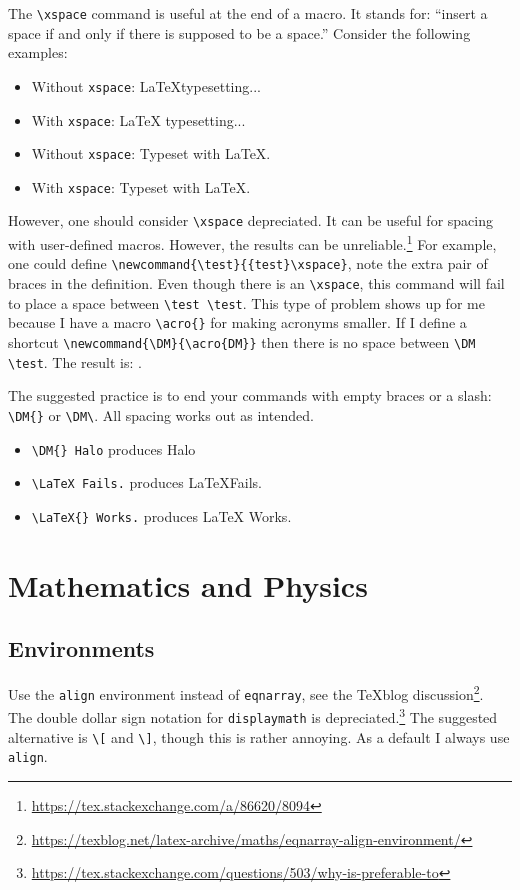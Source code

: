 The \verb!\xspace! command is useful at the end of a macro. It stands for: ``insert a space if and only if there is supposed to be a space.'' Consider the following examples:
\begin{itemize}
	\item Without \texttt{xspace}: \LaTeX typesetting...
	\item With \texttt{xspace}: \LaTeX\xspace typesetting...
	\item Without \texttt{xspace}: Typeset with \LaTeX.
	\item With \texttt{xspace}: Typeset with \LaTeX\xspace.
\end{itemize}
However, one should consider \verb!\xspace! depreciated. It can be useful for spacing with user-defined macros. However, the results can be unreliable.\footnote{\url{https://tex.stackexchange.com/a/86620/8094}}  For example, one could define \verb!\newcommand{\test}{{test}\xspace}!, note the extra pair of braces in the definition. Even though there is an \verb!\xspace!, this command will fail to place a space between \verb!\test \test!. This type of problem shows up for me because I have a macro \verb!\acro{}! for making acronyms smaller. If I define a shortcut \verb!\newcommand{\DM}{\acro{DM}}! then there is no space between \verb!\DM \test!. The result is: \acro{DM}\xspace {test}. 

The suggested practice is to end your commands with empty braces or a slash: \verb!\DM{}! or \verb!\DM\!. All spacing works out as intended. 
\begin{itemize}
	\item \verb!\DM{} Halo! produces \DM{} Halo
	\item \verb!\LaTeX Fails.! produces \LaTeX Fails.
	\item \verb!\LaTeX{} Works.! produces \LaTeX{} Works.
\end{itemize}






\section{Mathematics and Physics}

\subsection{Environments}

Use the \texttt{align} environment instead of \texttt{eqnarray}, see the TeXblog discussion\footnote{\url{https://texblog.net/latex-archive/maths/eqnarray-align-environment/}}. The double dollar sign notation for \texttt{displaymath} is depreciated.\footnote{\url{https://tex.stackexchange.com/questions/503/why-is-preferable-to}} The suggested alternative is \verb!\[! and \verb!\]!, though this is rather annoying. As a default I always use \texttt{align}.

